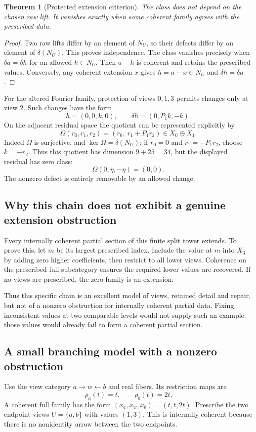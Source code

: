 \documentclass[11pt]{article}
\newtheorem{theorem}{Theorem}[section]
\theoremstyle{definition}
\theoremstyle{remark}
\begin{document}
\begin{theorem}[Protected extension criterion]
The class does not depend on the chosen raw lift. It vanishes exactly when some coherent family agrees with the prescribed data.
\end{theorem}
\begin{proof}
Two raw lifts differ by an element of $N_U$, so their defects differ by an element of $\delta(N_U)$. This proves independence. The class vanishes precisely when $\delta a=\delta h$ for an allowed $h\in N_U$. Then $a-h$ is coherent and retains the prescribed values. Conversely, any coherent extension $x$ gives $h=a-x\in N_U$ and $\delta h=\delta a$.
\end{proof}

For the altered Fourier family, protection of views $0,1,3$ permits changes only at view 2. Such changes have the form
\[
 h=(0,0,k,0),\qquad \delta h=(0,P_1k,-k).
\]
On the adjacent residual space the quotient can be represented explicitly by
\[
 \Omega(r_0,r_1,r_2)=(r_0,\ r_1+P_1r_2)\in X_0\oplus X_1.
\]
Indeed $\Omega$ is surjective, and $\ker\Omega=\delta(N_U)$: if $r_0=0$ and $r_1=-P_1r_2$, choose $k=-r_2$. Thus this quotient has dimension $9+25=34$, but the displayed residual has zero class:
\[
 \Omega(0,\eta,-\eta)=(0,0).
\]
The nonzero defect is entirely removable by an allowed change.

\subsection{Why this chain does not exhibit a genuine extension obstruction}
Every internally coherent partial section of this finite split tower extends. To prove this, let $m$ be its largest prescribed index. Include the value at $m$ into $X_3$ by adding zero higher coefficients, then restrict to all lower views. Coherence on the prescribed full subcategory ensures the required lower values are recovered. If no views are prescribed, the zero family is an extension.

Thus this specific chain is an excellent model of views, retained detail and repair, but not of a nonzero obstruction for internally coherent partial data. Fixing inconsistent values at two comparable levels would not supply such an example: those values would already fail to form a coherent partial section.

\subsection{A small branching model with a nonzero obstruction}
Use the view category $a\to w\leftarrow b$ and real fibers. Its restriction maps are
\[
 \rho_a(t)=t,\qquad \rho_b(t)=2t.
\]
A coherent full family has the form $(x_a,x_w,x_b)=(t,t,2t)$. Prescribe the two endpoint views $U=\{a,b\}$ with values $(1,3)$. This is internally coherent because there is no nonidentity arrow between the two endpoints.
\end{document}
